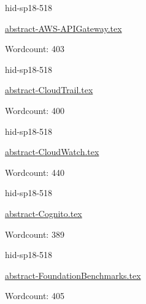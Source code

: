 

\begin{IU}

hid-sp18-518

\href{https://github.com/cloudmesh-community/hid-sp18-518/blob/master//technology/abstract-AWS-APIGateway.tex}{abstract-AWS-APIGateway.tex}

 

Wordcount: 403

\end{IU}



\begin{IU}

hid-sp18-518

\href{https://github.com/cloudmesh-community/hid-sp18-518/blob/master//technology/abstract-CloudTrail.tex}{abstract-CloudTrail.tex}

 

Wordcount: 400

\end{IU}



\begin{IU}

hid-sp18-518

\href{https://github.com/cloudmesh-community/hid-sp18-518/blob/master//technology/abstract-CloudWatch.tex}{abstract-CloudWatch.tex}

 

Wordcount: 440

\end{IU}



\begin{IU}

hid-sp18-518

\href{https://github.com/cloudmesh-community/hid-sp18-518/blob/master//technology/abstract-Cognito.tex}{abstract-Cognito.tex}

 

Wordcount: 389

\end{IU}



\begin{IU}

hid-sp18-518

\href{https://github.com/cloudmesh-community/hid-sp18-518/blob/master//technology/abstract-FoundationBenchmarks.tex}{abstract-FoundationBenchmarks.tex}

 

Wordcount: 405

\end{IU}


